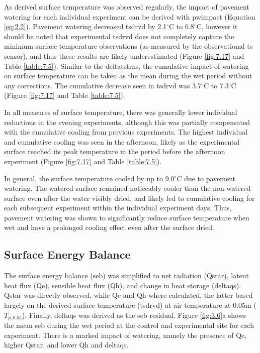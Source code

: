 \documentclass[final,3p,times,authoryear]{elsarticle}
\begin{document}
As derived surface temperature was observed regularly, the impact of pavement
watering for each individual experiment can be derived with \gls{pwimpact} (Equation \ref{eq:2.2}). Pavement watering decreased \gls{tsdrvd} by 2.1$^{\circ}$C to 6.8$^{\circ}$C, however it should be noted that experimental \gls{tsdrvd} does not completely capture the minimum surface temperature observations (as measured by the observational \gls{ts} sensor), and thus these results are likely underestimated (Figure \ref{fig:7.17} and Table \ref{table:7.5}). Similar to the \gls{deltatstrns}, the cumulative impact of watering on surface temperature can be taken as the mean during the wet period without any corrections. The cumulative decrease seen in \gls{tsdrvd} was 3.7$^{\circ}$C to 7.3$^{\circ}$C (Figure \ref{fig:7.17} and Table \ref{table:7.5}).

In all measures of surface temperature, there was generally lower individual reductions
in the evening experiments, although this was partially compensated with the
cumulative cooling from previous experiments. The highest individual and cumulative
cooling was seen in the afternoon, likely as the experimental surface reached its peak
temperature in the period before the afternoon experiment (Figure \ref{fig:7.17} and Table \ref{table:7.5}).

In general, the surface temperature cooled by up to 9.0$^{\circ}$C due to pavement watering.
The watered surface remained noticeably cooler than the non-watered surface even after
the water visibly dried, and likely led to cumulative cooling for each subsequent
experiment within the individual experiment days. Thus, pavement watering was shown
to significantly reduce surface temperature when wet and have a prolonged cooling
effect even after the surface dried.

\subsection{Surface Energy Balance}\label{sec:discussion3.4}

The surface energy balance (\gls{seb}) was simplified to net radiation (\gls{Qstar}), latent heat flux (\gls{Qe}), sensible heat flux (\gls{Qh}), and change in heat storage (\gls{deltaqs}). \gls{Qstar} was directly observed, while \gls{Qe} and \gls{Qh} where calculated, the latter based largely on the derived surface temperature (\gls{tsdrvd}) at air temperature at 0.05m ($T_{p,0.05}$). Finally, \gls{deltaqs} was derived as the \gls{seb} residual. Figure \ref{fig:3.6}a shows the mean \gls{seb} during the wet period at the control and experimental site for each experiment. There is a marked impact of watering, namely the presence of \gls{Qe}, higher \gls{Qstar}, and lower \gls{Qh} and \gls{deltaqs}.
\end{document}
